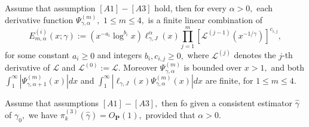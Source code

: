 \documentclass[10pt,a4paper]{amsart}
\begin{document}
\begin{proposition}
\textbf{\label{prop2}}Assume that assumption $\left[  A1\right]  -\left[
A3\right]  $ hold, then for every $\alpha>0,$ each derivative function
$\Psi_{\gamma,\alpha}^{\left(  m\right)  },$ $1\leq m\leq4,$ is a finite
linear combination of
\begin{equation}
E_{m,\alpha}^{\left(  i\right)  }\left(  x;\gamma\right)  :=\left(  x^{-a_{i}%
}\log^{b_{i}}x\right)  \ell_{\gamma,J}^{\alpha}\left(  x\right)
{\textstyle\prod_{j=1}^{m}}
\left[  \mathcal{L}^{\left(  j-1\right)  }\left(  x^{-1/\gamma}\right)
\right]  ^{c_{i,j}}, \label{lc}%
\end{equation}
for some constant $a_{i}\geq0$ and integers $b_{i},c_{i,j}\geq0,$ where
$\mathcal{L}^{\left(  j\right)  }$ denotes the $j$-th derivative of
$\mathcal{L} $ and $\mathcal{L}^{\left(  0\right)  }:=\mathcal{L}.$ Moreover
$\Psi_{\gamma,\alpha}^{\left(  m\right)  }$ is bounded over $x>1,$ and both
$\int_{1}^{\infty}\left\vert \Psi_{\gamma,\alpha+1}^{\left(  m\right)
}\left(  x\right)  \right\vert dx$ and $\int_{1}^{\infty}\left\vert
\ell_{\gamma,J}\left(  x\right)  \Psi_{\gamma,\alpha}^{\left(  m\right)
}\left(  x\right)  \right\vert dx$ are finite, for $1\leq m\leq4.$
\end{proposition}

\begin{lemma}
\textbf{\label{lemma4}}Assume that assumptions $\left[  A1\right]  -\left[
A3\right]  ,$ then fo given a consistent estimator $\widehat{\gamma}$ of
$\gamma_{0},$ we have $\pi_{k}^{\left(  3\right)  }\left(  \widehat{\gamma
}\right)  =O_{\mathbf{P}}\left(  1\right)  ,$ provided that $\alpha>0.$
\end{lemma}
\end{document}
